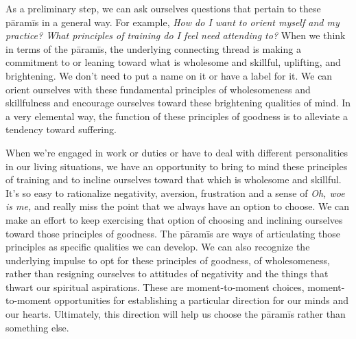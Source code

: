 As a preliminary step, we can ask ourselves questions that pertain to 
these pāramīs in a general way. For example, \emph{How do I want to 
orient myself and my practice? What principles of training do I feel 
need attending to?} When we think in terms of the pāramīs, the 
underlying connecting thread is making a commitment to or leaning 
toward what is wholesome and skillful, uplifting, and brightening. We 
don't need to put a name on it or have a label for it. We can orient 
ourselves with these fundamental principles of wholesomeness and 
skillfulness and encourage ourselves toward these brightening qualities 
of mind. In a very elemental way, the function of these principles of 
goodness is to alleviate a tendency toward suffering.

When we're engaged in work or duties or have to deal with different 
personalities in our living situations, we have an opportunity to bring 
to mind these principles of training and to incline ourselves toward 
that which is wholesome and skillful. It's so easy to rationalize 
negativity, aversion, frustration and a sense of \emph{Oh, woe is me,} 
and really miss the point that we always have an option to choose. We 
can make an effort to keep exercising that option of choosing and 
inclining ourselves toward those principles of goodness. The pāramīs 
are ways of articulating those principles as specific qualities we can 
develop. We can also recognize the underlying impulse to opt for these 
principles of goodness, of wholesomeness, rather than resigning 
ourselves to attitudes of negativity and the things that thwart our 
spiritual aspirations. These are moment-to-moment choices, 
moment-to-moment opportunities for establishing a particular direction 
for our minds and our hearts. Ultimately, this direction will help us 
choose the pāramīs rather than something else.


